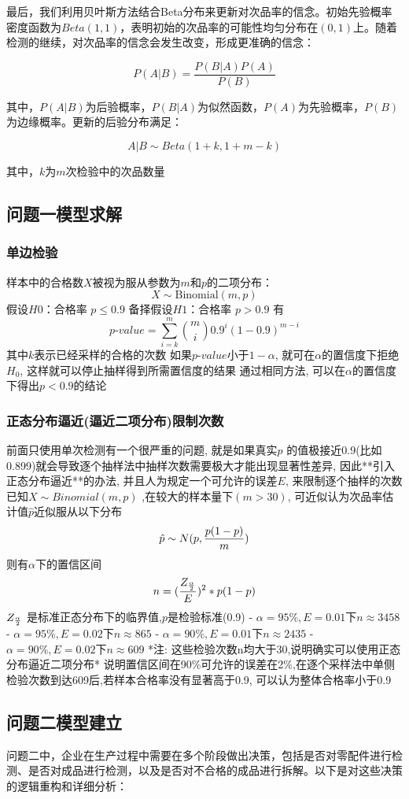 \documentclass[withoutpreface,bwprint]{cumcmthesis}
\begin{document}
最后，我们利用贝叶斯方法结合Beta分布来更新对次品率的信念。初始先验概率密度函数为$Beta(1,1)$，表明初始的次品率的可能性均匀分布在$(0,1)$上。随着检测的继续，对次品率的信念会发生改变，形成更准确的信念：

$$
P(A|B) = \frac{P(B|A)P(A)}{P(B)}
$$

其中，$P(A|B)$为后验概率，$P(B|A)$为似然函数，$P(A)$为先验概率，$P(B)$为边缘概率。更新的后验分布满足：

$$
A|B \sim Beta(1+k, 1+m-k)
$$

其中，$k$为$m$次检验中的次品数量

\subsection{问题一模型求解}
\subsubsection{单边检验}
样本中的合格数\(X\)被视为服从参数为\(m\)和\(p\)的二项分布：
$$X \sim \text{Binomial}(m, p)$$
假设$H0$：合格率 $p\leq0.9$
备择假设$H1$​：合格率 $p>0.9$
有
$$
p\text{-}value=\sum_{i=k}^{m}\binom{m}{i}0.9^i(1-0.9)^{m-i}
$$
其中$k$表示已经采样的合格的次数
如果$p\text{-}value$小于$1-\alpha$, 就可在$\alpha$的置信度下拒绝$H_0$, 这样就可以停止抽样得到所需置信度的结果
通过相同方法, 可以在$\alpha$的置信度下得出$p<0.9$的结论
\subsubsection{正态分布逼近(逼近二项分布)限制次数}
前面只使用单次检测有一个很严重的问题, 就是如果真实$p$ 的值极接近0.9(比如0.899)就会导致逐个抽样法中抽样次数需要极大才能出现显著性差异, 因此**引入正态分布逼近**的办法, 并且人为规定一个可允许的误差$E$, 来限制逐个抽样的次数
已知$X\sim Binomial(m,p)$ ,在较大的样本量下$(m>30)$, 可近似认为次品率估计值$\hat p$近似服从以下分布
$$
\hat p \sim N(p,{p(1-p) \over m})
$$
则有$\alpha$下的置信区间
$$
n=({Z_{\alpha \over 2} \over E})^2*p(1-p)
$$
$Z_{\alpha \over 2}$ 是标准正态分布下的临界值,$p$是检验标准(0.9)
- $\alpha=95\%,E=0.01$下$n\approx 3458$
- $\alpha=95\%,E=0.02$下$n\approx 865$
- $\alpha=90\%,E=0.01$下$n\approx 2435$
- $\alpha=90\%,E=0.02$下$n\approx 609$
*注: 这些检验次数n均大于30,说明确实可以使用正态分布逼近二项分布*
说明置信区间在90\%可允许的误差在2\%,在逐个采样法中单侧检验次数到达609后,若样本合格率没有显著高于0.9, 可以认为整体合格率小于0.9

\subsection{问题二模型建立}
问题二中，企业在生产过程中需要在多个阶段做出决策，包括是否对零配件进行检测、是否对成品进行检测，以及是否对不合格的成品进行拆解。以下是对这些决策的逻辑重构和详细分析：
\end{document}
